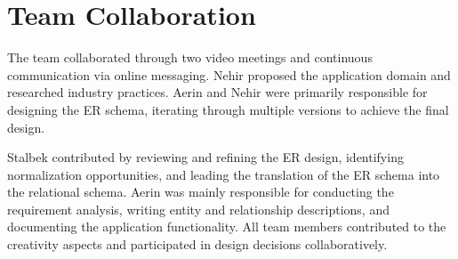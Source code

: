 \documentclass[11pt]{article}
\begin{document}
\section{Team Collaboration}

The team collaborated through two video meetings and continuous communication via online messaging. Nehir proposed the application domain and researched industry practices. Aerin and Nehir were primarily responsible for designing the ER schema, iterating through multiple versions to achieve the final design.

Stalbek contributed by reviewing and refining the ER design, identifying normalization opportunities, and leading the translation of the ER schema into the relational schema. Aerin was mainly responsible for conducting the requirement analysis, writing entity and relationship descriptions, and documenting the application functionality. All team members contributed to the creativity aspects and participated in design decisions collaboratively.
\end{document}
